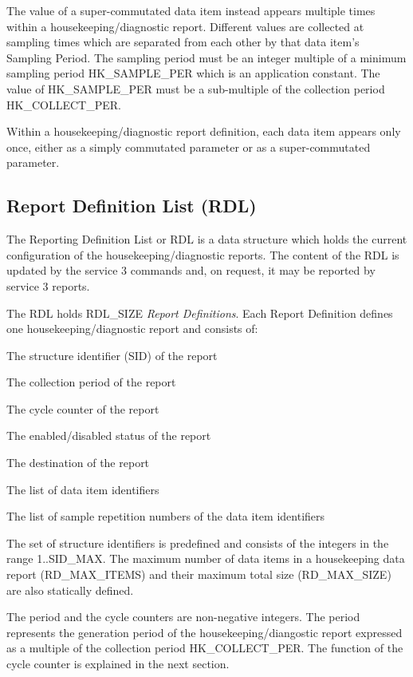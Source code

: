 \documentclass[a4paper,10pt]{article}
\newenvironment{fw_enumerate}					%
{\begin{enumerate}
  \setlength{\itemsep}{1mm}
  \setlength{\parskip}{0pt}
  \setlength{\parsep}{0pt}}
{\end{enumerate}}
\begin{document}
The value of a super-commutated data item instead appears multiple times within a housekeeping/diagnostic report. Different values are collected at sampling times which are separated from each other by that data item's Sampling Period. The sampling period must be an integer multiple of a minimum sampling period HK\_SAMPLE\_PER which is an application constant. The value of HK\_SAMPLE\_PER must be a sub-multiple of the collection period HK\_COLLECT\_PER.

Within a housekeeping/diagnostic report definition, each data item appears only once, either as a simply commutated parameter or as a super-commutated parameter.

\subsection{Report Definition List (RDL)}\label{sec:RDL}
The Reporting Definition List or RDL is a data structure which holds the current configuration of the housekeeping/diagnostic reports. The content of the RDL is updated by the service 3 commands and, on request, it may be reported by service 3 reports.

The RDL holds RDL\_SIZE \textit{Report Definitions}. Each Report Definition defines one housekeeping/diagnostic report and consists of: 

\begin{fw_enumerate}
\item The structure identifier (SID) of the report
\item The collection period of the report
\item The cycle counter of the report
\item The enabled/disabled status of the report
\item The destination of the report
\item The list of data item identifiers
\item The list of sample repetition numbers of the data item identifiers
\end{fw_enumerate}

The set of structure identifiers is predefined and consists of the integers in the range 1..SID\_MAX. The maximum number of data items in a housekeeping data report (RD\_MAX\_ITEMS) and their maximum total size (RD\_MAX\_SIZE) are also statically defined.

The period and the cycle counters are non-negative integers. The period represents the generation period of the housekeeping/diangostic report expressed as a multiple of the collection period HK\_COLLECT\_PER. The function of the cycle counter is explained in the next section.
\end{document}
